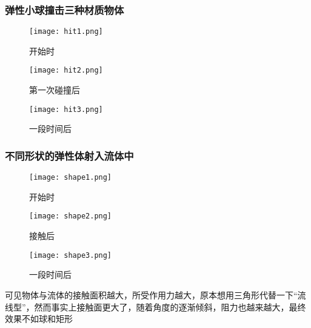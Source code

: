 \documentclass[14pt]{scrartcl} %
\begin{document}
\pagebreak
\subsubsection{弹性小球撞击三种材质物体}
\begin{figure}[htbp]
	\centering
	\texttt{[image: hit1.png]} %
	\caption{开始时}
	\centering
	\texttt{[image: hit2.png]} %
	\caption{第一次碰撞后}
	\centering
	\texttt{[image: hit3.png]} %
	\caption{一段时间后}
\end{figure}

\pagebreak
\subsubsection{不同形状的弹性体射入流体中}
\begin{figure}[htbp]
	\centering
	\texttt{[image: shape1.png]} %
	\caption{开始时}
	
\end{figure}
\pagebreak
\begin{figure}[htbp]
	\centering
	\texttt{[image: shape2.png]} %
	\caption{接触后}
\end{figure}
\pagebreak
\begin{figure}[htbp]
	\centering
	\texttt{[image: shape3.png]} %
	\caption{一段时间后}
\end{figure}

可见物体与流体的接触面积越大，所受作用力越大，原本想用三角形代替一下“流线型”，然而事实上接触面更大了，随着角度的逐渐倾斜，阻力也越来越大，最终效果不如球和矩形

\pagebreak



\end{document}
